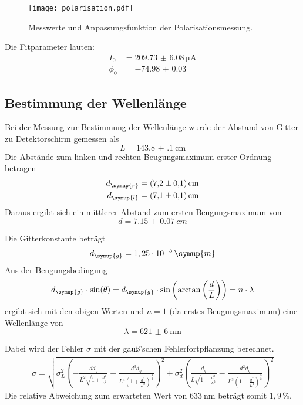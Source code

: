 \begin{figure}[H]
  \centering
  \texttt{[image: polarisation.pdf]}
  \caption{Messwerte und Anpassungsfunktion der Polarisationsmessung.}
  \label{fig:polarisation}
\end{figure}

Die Fitparameter lauten:
\begin{align*}
  I_0 &= \SI{209.73(608)}{\micro\ampere} \\
  \phi_0 &= \SI{-74.98(3)}{}
\end{align*}

\subsection{Bestimmung der Wellenlänge}
Bei der Messung zur Bestimmung der Wellenlänge wurde der Abstand von Gitter zu
Detektorschirm gemessen als
\begin{equation*}
  L = \SI{143.8(1)}{\centi\meter}
\end{equation*}
Die Abstände zum linken und rechten Beugungsmaximum erster Ordnung betragen
\begin{align*}
  d_\symup{r} &= \SI{7.2(1)}{\centi\meter} \\
  d_\symup{l} &= \SI{7.1(1)}{\centi\meter}
\end{align*}
Daraus ergibt sich ein mittlerer Abstand zum ersten Beugungsmaximum von
\begin{equation*}
  d = \SI{7.15(7)}{cm}
\end{equation*}


Die Gitterkonstante beträgt
\begin{equation*}
  d_\symup{g} = 1,25 \cdot 10^{-5} \, \symup{m}
\end{equation*}
Aus der Beugungsbedingung
\begin{equation*}
  d_\symup{g} \cdot \sin(\theta) = d_\symup{g} \cdot \sin\left(\arctan\left(\frac{d}{L}\right)\right) = n \cdot \lambda
\end{equation*}
ergibt sich mit den obigen Werten und $n = 1$ (da erstes Beugungsmaximum) eine
Wellenlänge von
\begin{equation*}
  \lambda = \SI{621(6)}{\nano\meter}
\end{equation*}

Dabei wird der Fehler $\sigma$ mit der gauß'schen Fehlerfortpflanzung berechnet.
\begin{align*}
  \sigma = \sqrt{\sigma_{L}^{2} \left(- \frac{d d_{g}}{L^{2} \sqrt{1 + \frac{d^{2}}{L^{2}}}}
  + \frac{d^{3} d_{g}}{L^{4} \left(1 + \frac{d^{2}}{L^{2}}\right)^{\frac{3}{2}}}\right)^{2} + \sigma_{d}^{2} \left(\frac{d_{g}}{L \sqrt{1 + \frac{d^{2}}{L^{2}}}} - \frac{d^{2} d_{g}}{L^{3} \left(1
  + \frac{d^{2}}{L^{2}}\right)^{\frac{3}{2}}}\right)^{2} }
\end{align*}
Die relative Abweichung zum erwarteten Wert von $\SI{633}{\nano\meter}$ beträgt
somit $1,9\,\%$.
